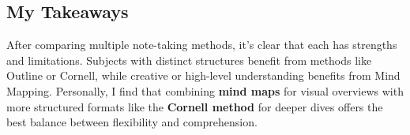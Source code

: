 \vspace{1.5em}
\subsection*{My Takeaways}

After comparing multiple note-taking methods, it's clear that each has strengths and limitations. Subjects with distinct structures benefit from methods like Outline or Cornell, while creative or high-level understanding benefits from Mind Mapping. Personally, I find that combining \textbf{mind maps} for visual overviews with more structured formats like the \textbf{Cornell method} for deeper dives offers the best balance between flexibility and comprehension.


